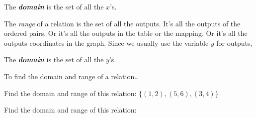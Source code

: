 \begin{center}
\begin{tcolorbox}[width=3in]
    The {\bfseries\itshape domain} is the set of all the $x$'s.
\end{tcolorbox}
\end{center}

The \emph{range} of a relation is the set of all the outputs.
It's all the outputs of the ordered pairs.
Or it's all the outputs in the table or the mapping.
Or it's all the outputs coordinates in the graph.
Since we usually use the variable $y$ for outputs,

\begin{center}
\begin{tcolorbox}[width=3in]
    The {\bfseries\itshape domain} is the set of all the $y$'s.
\end{tcolorbox}
\end{center}


\begin{myConceptSteps}{To find the domain and range of a relation\dots}
\end{myConceptSteps}

\begin{myExample}{
    Find the domain and range of this relation:
    \(
        \{ (1,2), (5,6), (3,4) \}
    \)
}
    \vspace{1in}
\end{myExample}

\begin{myExample}{
    Find the domain and range of this relation:
    \begin{center}
    \end{center}
}
    \vspace{1in}
\end{myExample}


